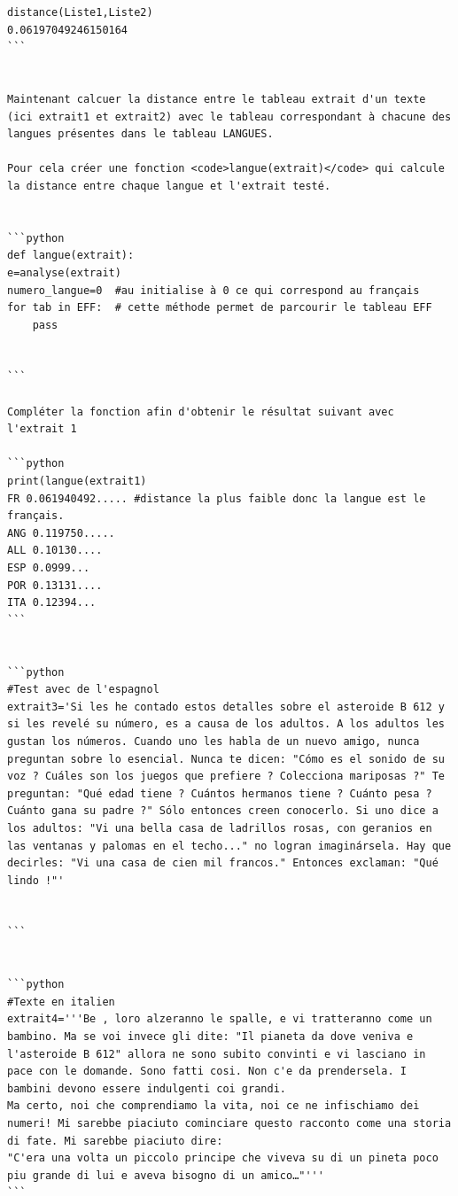 \documentclass[
]{article}
\begin{document}
\begin{verbatim}
distance(Liste1,Liste2)
0.06197049246150164
```


Maintenant calcuer la distance entre le tableau extrait d'un texte (ici extrait1 et extrait2) avec le tableau correspondant à chacune des langues présentes dans le tableau LANGUES.

Pour cela créer une fonction <code>langue(extrait)</code> qui calcule la distance entre chaque langue et l'extrait testé.


```python
def langue(extrait):
e=analyse(extrait)
numero_langue=0  #au initialise à 0 ce qui correspond au français
for tab in EFF:  # cette méthode permet de parcourir le tableau EFF 
    pass
    

```

Compléter la fonction afin d'obtenir le résultat suivant avec l'extrait 1

```python
print(langue(extrait1)
FR 0.061940492..... #distance la plus faible donc la langue est le français.
ANG 0.119750.....
ALL 0.10130....
ESP 0.0999...
POR 0.13131....
ITA 0.12394...
```


```python
#Test avec de l'espagnol
extrait3='Si les he contado estos detalles sobre el asteroide B 612 y si les revelé su número, es a causa de los adultos. A los adultos les gustan los números. Cuando uno les habla de un nuevo amigo, nunca preguntan sobre lo esencial. Nunca te dicen: "Cómo es el sonido de su voz ? Cuáles son los juegos que prefiere ? Colecciona mariposas ?" Te preguntan: "Qué edad tiene ? Cuántos hermanos tiene ? Cuánto pesa ? Cuánto gana su padre ?" Sólo entonces creen conocerlo. Si uno dice a los adultos: "Vi una bella casa de ladrillos rosas, con geranios en las ventanas y palomas en el techo..." no logran imaginársela. Hay que decirles: "Vi una casa de cien mil francos." Entonces exclaman: "Qué lindo !"'


```


```python
#Texte en italien
extrait4='''Be , loro alzeranno le spalle, e vi tratteranno come un bambino. Ma se voi invece gli dite: "Il pianeta da dove veniva e l'asteroide B 612" allora ne sono subito convinti e vi lasciano in pace con le domande. Sono fatti cosi. Non c'e da prendersela. I bambini devono essere indulgenti coi grandi.
Ma certo, noi che comprendiamo la vita, noi ce ne infischiamo dei numeri! Mi sarebbe piaciuto cominciare questo racconto come una storia di fate. Mi sarebbe piaciuto dire:
"C'era una volta un piccolo principe che viveva su di un pineta poco piu grande di lui e aveva bisogno di un amico…"'''
```



\end{verbatim}
\end{document}

